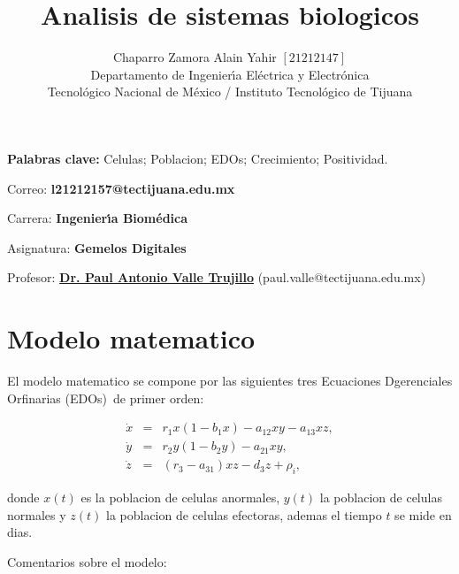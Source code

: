 \documentclass[letterpaper,11pt]{article}
\begin{document}
\title{Analisis de sistemas biologicos}
\author{Chaparro Zamora Alain Yahir $\left[ 21212147\right] $ \\
Departamento de Ingenier\'{\i}a El\'{e}ctrica y Electr\'{o}nica\\
Tecnol\'{o}gico Nacional de M\'{e}xico / Instituto Tecnol\'{o}gico de Tijuana%
}
\maketitle

\noindent \textbf{Palabras clave: }Celulas; Poblacion; EDOs; Crecimiento;
Positividad.

\noindent Correo: \textbf{l21212157@tectijuana.edu.mx}

\noindent \noindent Carrera: \textbf{Ingenier\'{\i}a Biom\'{e}dica }

\noindent Asignatura: \textbf{Gemelos Digitales}

\noindent Profesor: \href{https://biomath.xyz/}{\textbf{Dr. Paul Antonio
Valle Trujillo}} (paul.valle@tectijuana.edu.mx)

\section{Modelo matematico}

\bigskip El modelo matematico se compone por las siguientes tres Ecuaciones
Dgerenciales Orfinarias (EDOs)\ de primer orden:

\begin{eqnarray}
\dot{x} &=&r_{1}x(1-b_{1}x)-a_{12}xy-a_{13}xz,  \label{dx} \\
\dot{y} &=&r_{2}y(1-b_{2}y)-a_{21}xy,  \label{dy} \\
\dot{z} &=&(r_{3}-a_{31})xz-d_{3}z+\rho _{i},  \label{dz}
\end{eqnarray}

donde $x(t)$ es la poblacion de celulas anormales, $y(t)$ la poblacion de
celulas normales y $z(t)$ la poblacion de celulas efectoras, ademas el
tiempo $t$ se mide en dias.

Comentarios sobre el modelo:
\end{document}
